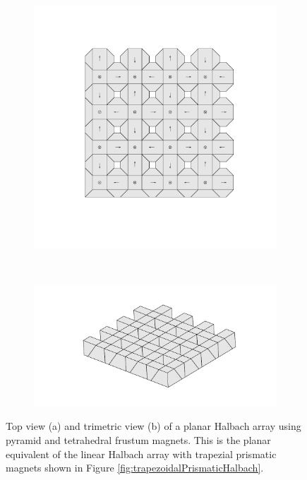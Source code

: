 \begin{figure}
    \centering
    \begin{subfigure}{\linewidth}
        \centering
        \includegraphics[width=\linewidth]{images/frustumPlanarArraypdf.pdf}
        \vspace{-25mm}\subcaption{}
    \end{subfigure} \\
    \begin{subfigure}{\linewidth}
        \centering
        \includegraphics[width=\linewidth]{images/frustumPlanarArrayAngledpdf.pdf}
        \vspace{-10mm}\subcaption{}
    \end{subfigure}
    \caption{Top view (a) and trimetric view (b) of a planar Halbach array using pyramid and tetrahedral frustum magnets. This is the planar equivalent of the linear Halbach array with trapezial prismatic magnets shown in Figure \ref{fig:trapezoidalPrismaticHalbach}.}
    \label{fig:planarHalbachArrayPolyhedral}
\end{figure}

